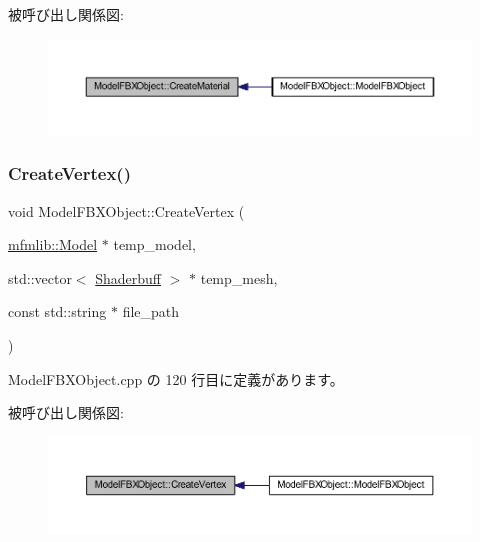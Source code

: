 被呼び出し関係図\+:
\nopagebreak
\begin{figure}[H]
\begin{center}
\leavevmode
\includegraphics[width=350pt]{class_model_f_b_x_object_a3fba4178f5a21dd3c180cb16f0a05106_icgraph}
\end{center}
\end{figure}
\mbox{\label{class_model_f_b_x_object_a962ffe35009b920c09e2aaa3154051e4}} 
\subsubsection{\texorpdfstring{Create\+Vertex()}{CreateVertex()}}
{\footnotesize\ttfamily void Model\+F\+B\+X\+Object\+::\+Create\+Vertex (\begin{DoxyParamCaption}\item[{\mbox{\hyperlink{classmfmlib_1_1_model}{mfmlib\+::\+Model}} $\ast$}]{temp\+\_\+model,  }\item[{std\+::vector$<$ \mbox{\hyperlink{struct_model_f_b_x_object_1_1_shaderbuff}{Shaderbuff}} $>$ $\ast$}]{temp\+\_\+mesh,  }\item[{const std\+::string $\ast$}]{file\+\_\+path }\end{DoxyParamCaption})\hspace{0.3cm}{\ttfamily [private]}}



 Model\+F\+B\+X\+Object.\+cpp の 120 行目に定義があります。

被呼び出し関係図\+:
\nopagebreak
\begin{figure}[H]
\begin{center}
\leavevmode
\includegraphics[width=350pt]{class_model_f_b_x_object_a962ffe35009b920c09e2aaa3154051e4_icgraph}
\end{center}
\end{figure}
\mbox{\label{class_model_f_b_x_object_abbeaa886c4f8f6c0d1608d58cc013226}} 
